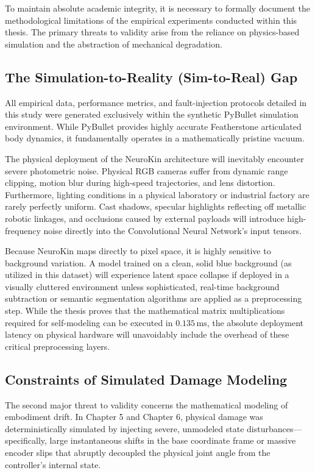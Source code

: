 \documentclass[12pt,a4paper,oneside]{report}
\begin{document}
To maintain absolute academic integrity, it is necessary to formally document the methodological limitations of the empirical experiments conducted within this thesis. The primary threats to validity arise from the reliance on physics-based simulation and the abstraction of mechanical degradation.

\subsection{The Simulation-to-Reality (Sim-to-Real) Gap}

All empirical data, performance metrics, and fault-injection protocols detailed in this study were generated exclusively within the synthetic PyBullet simulation environment. While PyBullet provides highly accurate Featherstone articulated body dynamics, it fundamentally operates in a mathematically pristine vacuum. 

The physical deployment of the NeuroKin architecture will inevitably encounter severe photometric noise. Physical RGB cameras suffer from dynamic range clipping, motion blur during high-speed trajectories, and lens distortion. Furthermore, lighting conditions in a physical laboratory or industrial factory are rarely perfectly uniform. Cast shadows, specular highlights reflecting off metallic robotic linkages, and occlusions caused by external payloads will introduce high-frequency noise directly into the Convolutional Neural Network's input tensors. 

Because NeuroKin maps directly to pixel space, it is highly sensitive to background variation. A model trained on a clean, solid blue background (as utilized in this dataset) will experience latent space collapse if deployed in a visually cluttered environment unless sophisticated, real-time background subtraction or semantic segmentation algorithms are applied as a preprocessing step. While the thesis proves that the mathematical matrix multiplications required for self-modeling can be executed in $0.135\,\mathrm{ms}$, the absolute deployment latency on physical hardware will unavoidably include the overhead of these critical preprocessing layers.

\subsection{Constraints of Simulated Damage Modeling}

The second major threat to validity concerns the mathematical modeling of embodiment drift. In Chapter 5 and Chapter 6, physical damage was deterministically simulated by injecting severe, unmodeled state disturbances—specifically, large instantaneous shifts in the base coordinate frame or massive encoder slips that abruptly decoupled the physical joint angle from the controller's internal state.
\end{document}
